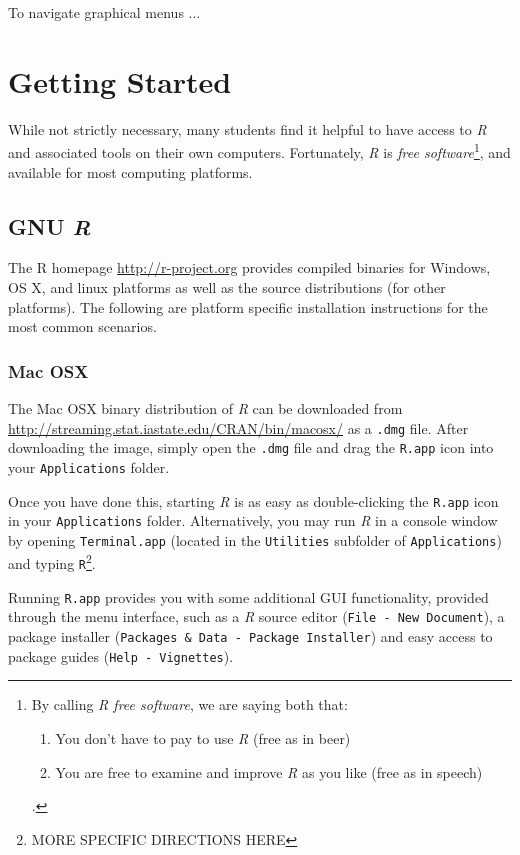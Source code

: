 \documentclass[10pt,letterpaper]{article}
\begin{document}

To navigate graphical menus ...

\section{Getting Started}

While not strictly necessary, many students find it helpful to have access to \emph{R} and associated tools on their own computers.  Fortunately, \emph{R} is \emph{free software}\footnote{By calling \emph{R free software}, we are saying both that: \begin{enumerate} \item You don't have to pay to use \emph{R} (free as in beer) \item You are free to examine and improve \emph{R} as you like (free as in speech)\end{enumerate}.}, and available for most computing platforms.

\subsection{GNU \emph{R}}

The R homepage \url{http://r-project.org} provides compiled binaries for Windows, OS X, and linux platforms as well as the source distributions (for other platforms).  The following are platform specific installation instructions for the most common scenarios.

\subsubsection{Mac OSX} %
\label{ssub:mac_osx}

The Mac OSX binary distribution of \emph{R} can be downloaded from  \url{http://streaming.stat.iastate.edu/CRAN/bin/macosx/} as a \texttt{.dmg} file.  After downloading the image, simply open the \texttt{.dmg} file and drag the \texttt{R.app} icon into your \texttt{Applications} folder.

Once you have done this, starting \emph{R} is as easy as double-clicking the \texttt{R.app} icon in your \texttt{Applications} folder.  Alternatively, you may run \emph{R} in a console window by opening \texttt{Terminal.app} (located in the \texttt{Utilities} subfolder of \texttt{Applications}) and typing \texttt{R}\footnote{MORE SPECIFIC DIRECTIONS HERE}.

Running \texttt{R.app} provides you with some additional GUI functionality,
provided through the menu interface, such as a \emph{R} source editor
(\texttt{File - New Document}), a package installer (\texttt{Packages \& Data - Package Installer}) and easy access to package guides (\texttt{Help - Vignettes}).
\end{document}
